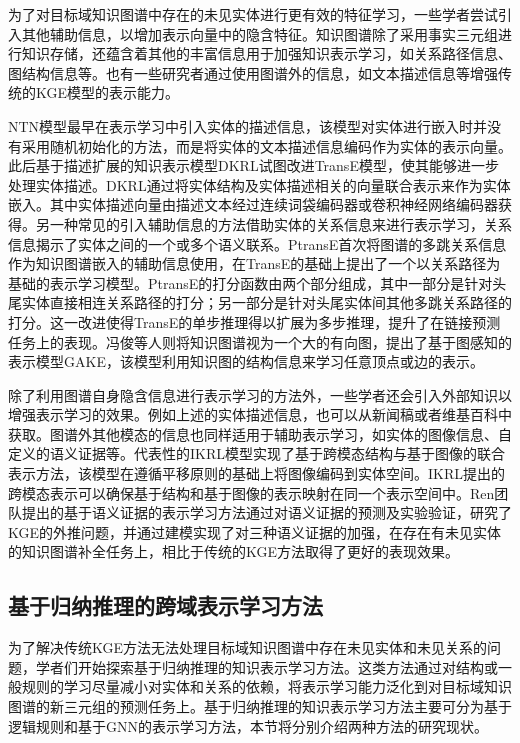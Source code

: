 为了对目标域知识图谱中存在的未见实体进行更有效的特征学习，一些学者尝试引入其他辅助信息，以增加表示向量中的隐含特征。知识图谱除了采用事实三元组进行知识存储，还蕴含着其他的丰富信息用于加强知识表示学习，如关系路径信息、图结构信息等。也有一些研究者通过使用图谱外的信息，如文本描述信息等增强传统的KGE模型的表示能力。

NTN\cite{socher2013reasoning}模型最早在表示学习中引入实体的描述信息，该模型对实体进行嵌入时并没有采用随机初始化的方法，而是将实体的文本描述信息编码作为实体的表示向量。此后基于描述扩展的知识表示模型DKRL\cite{xie2016representation}试图改进TransE模型，使其能够进一步处理实体描述。DKRL通过将实体结构及实体描述相关的向量联合表示来作为实体嵌入。其中实体描述向量由描述文本经过连续词袋\cite{valverde2012link}编码器或卷积神经网络编码器获得。另一种常见的引入辅助信息的方法借助实体的关系信息来进行表示学习，关系信息揭示了实体之间的一个或多个语义联系。PtransE\cite{lin2015modeling}首次将图谱的多跳关系信息作为知识图谱嵌入的辅助信息使用，在TransE的基础上提出了一个以关系路径为基础的表示学习模型。PtransE的打分函数由两个部分组成，其中一部分是针对头尾实体直接相连关系路径的打分；另一部分是针对头尾实体间其他多跳关系路径的打分。这一改进使得TransE的单步推理得以扩展为多步推理，提升了在链接预测任务上的表现。冯俊等人则将知识图谱视为一个大的有向图，提出了基于图感知的表示模型GAKE\cite{feng2016gake}，该模型利用知识图的结构信息来学习任意顶点或边的表示。

除了利用图谱自身隐含信息进行表示学习的方法外，一些学者还会引入外部知识以增强表示学习的效果。例如上述的实体描述信息，也可以从新闻稿或者维基百科中获取。图谱外其他模态的信息也同样适用于辅助表示学习，如实体的图像信息、自定义的语义证据等。代表性的IKRL\cite{xie2016image}模型实现了基于跨模态结构与基于图像的联合表示方法，该模型在遵循平移原则的基础上将图像编码到实体空间。IKRL提出的跨模态表示可以确保基于结构和基于图像的表示映射在同一个表示空间中。Ren\cite{li2022does}团队提出的基于语义证据的表示学习方法通过对语义证据的预测及实验验证，研究了KGE的外推问题，并通过建模实现了对三种语义证据的加强，在存在有未见实体的知识图谱补全任务上，相比于传统的KGE方法取得了更好的表现效果。

\subsection{基于归纳推理的跨域表示学习方法}
为了解决传统KGE方法无法处理目标域知识图谱中存在未见实体和未见关系的问题，学者们开始探索基于归纳推理的知识表示学习方法。这类方法通过对结构或一般规则的学习尽量减小对实体和关系的依赖，将表示学习能力泛化到对目标域知识图谱的新三元组的预测任务上。基于归纳推理的知识表示学习方法主要可分为基于逻辑规则和基于GNN的表示学习方法，本节将分别介绍两种方法的研究现状。

